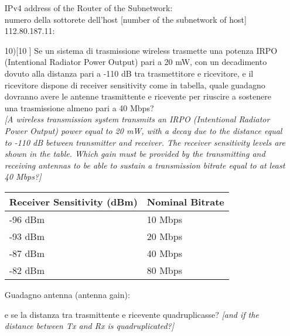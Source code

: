 \documentclass[a4paper, 12pt]{article}
\newcommand{\blankline}[1]{\uline{\hspace{#1}}}
\begin{document}
\begin{enumerate}
    \noindent IPv4 address of the Router of the Subnetwork: \blankline{8cm} \\
    \noindent numero della sottorete dell'host [number of the subnetwork of host] 112.80.187.11: \blankline{3cm}
    \vspace{2cm}
    
    \item[10)[10]] Se un sistema di trasmissione wireless trasmette una potenza IRPO (Intentional Radiator Power Output) pari a 20 mW, con un decadimento dovuto alla distanza pari a -110 dB tra trasmettitore e ricevitore, e il ricevitore dispone di receiver sensitivity come in tabella, quale guadagno dovranno avere le antenne trasmittente e ricevente per riuscire a sostenere una trasmissione almeno pari a 40 Mbps? \\
    \textit{[A wireless transmission system transmits an IRPO (Intentional Radiator Power Output) power equal to 20 mW, with a decay due to the distance equal to -110 dB between transmitter and receiver. The receiver sensitivity levels are shown in the table. Which gain must be provided by the transmitting and receiving antennas to be able to sustain a transmission bitrate equal to at least 40 Mbps?]}
    
    \vspace{1cm}
    
    \begin{center}
        \begin{tabular}{|l|l|}
            \hline
            \textbf{Receiver Sensitivity (dBm)} & \textbf{Nominal Bitrate} \\
            \hline
            -96 dBm & 10 Mbps \\
            -93 dBm & 20 Mbps \\
            -87 dBm & 40 Mbps \\
            -82 dBm & 80 Mbps \\
            \hline
        \end{tabular}
    \end{center}
    
    \vspace{1cm}
    
    \noindent Guadagno antenna (antenna gain): \blankline{5cm}
    
    \vspace{5pt}
    \noindent e se la distanza tra trasmittente e ricevente quadruplicasse? \textit{[and if the distance between Tx and Rx is quadruplicated?]}
    

\end{enumerate}
\end{document}
